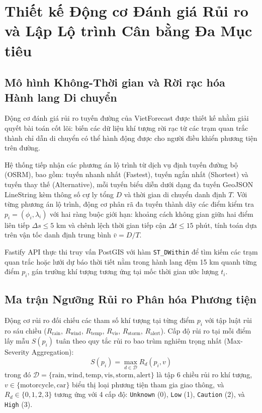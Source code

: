 \section{Thiết kế Động cơ Đánh giá Rủi ro và Lập Lộ trình Cân bằng Đa Mục tiêu}
\label{sec:route_risk_engine}

\subsection{Mô hình Không-Thời gian và Rời rạc hóa Hành lang Di chuyển}
Động cơ đánh giá rủi ro tuyến đường của VietForecast được thiết kế nhằm giải quyết bài toán cốt lõi: biến các dữ liệu khí tượng rời rạc từ các trạm quan trắc thành chỉ dẫn di chuyển có thể hành động được cho người điều khiển phương tiện trên đường.

Hệ thống tiếp nhận các phương án lộ trình từ dịch vụ định tuyến đường bộ (OSRM), bao gồm: tuyến nhanh nhất (Fastest), tuyến ngắn nhất (Shortest) và tuyến thay thế (Alternative), mỗi tuyến biểu diễn dưới dạng đa tuyến GeoJSON LineString kèm thông số cự ly tổng $D$ và thời gian di chuyển danh định $T$. Với từng phương án lộ trình, động cơ phân rã đa tuyến thành dãy các điểm kiểm tra $p_i = (\phi_i, \lambda_i)$ với hai ràng buộc giới hạn: khoảng cách không gian giữa hai điểm liên tiếp $\Delta s \le 5\text{ km}$ và chênh lệch thời gian tiếp cận $\Delta t \le 15\text{ phút}$, tính toán dựa trên vận tốc danh định trung bình $\bar{v} = D / T$.

Fastify API thực thi truy vấn PostGIS với hàm \texttt{ST\_DWithin} để tìm kiếm các trạm quan trắc hoặc lưới dự báo thời tiết nằm trong hành lang đệm 15 km quanh từng điểm $p_i$, gán trường khí tượng tương ứng tại mốc thời gian ước lượng $t_i$.

\subsection{Ma trận Ngưỡng Rủi ro Phân hóa Phương tiện}
Động cơ rủi ro đối chiếu các tham số khí tượng tại từng điểm $p_i$ với tập luật rủi ro sáu chiều ($R_{\text{rain}}$, $R_{\text{wind}}$, $R_{\text{temp}}$, $R_{\text{vis}}$, $R_{\text{storm}}$, $R_{\text{alert}}$). Cấp độ rủi ro tại mỗi điểm lấy mẫu $S(p_i)$ tuân theo quy tắc rủi ro bao trùm nghiêm trọng nhất (Max-Severity Aggregation):
\begin{equation}
\label{eq:max_severity_aggregation_vi}
S(p_i) = \max_{d \in \mathcal{D}} R_d(p_i, v)
\end{equation}
trong đó $\mathcal{D} = \{\text{rain}, \text{wind}, \text{temp}, \text{vis}, \text{storm}, \text{alert}\}$ là tập 6 chiều rủi ro khí tượng, $v \in \{\text{motorcycle}, \text{car}\}$ biểu thị loại phương tiện tham gia giao thông, và $R_d \in \{0, 1, 2, 3\}$ tương ứng với 4 cấp độ: \texttt{Unknown} (0), \texttt{Low} (1), \texttt{Caution} (2), và \texttt{High} (3).

